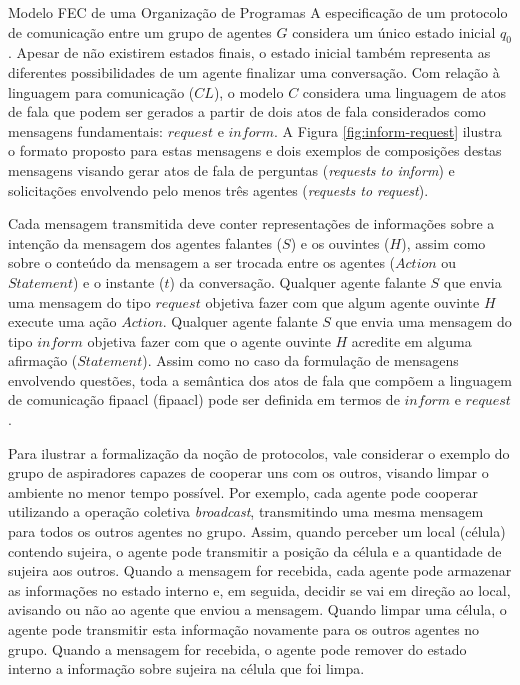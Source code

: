 \begin{section}{Modelo FEC de uma Organização de Programas}
        A especificação de um protocolo de comunicação entre um grupo de agentes $G$ considera um único estado inicial $q_0$. Apesar de não existirem estados finais, o estado inicial também representa as diferentes possibilidades de um agente finalizar uma conversação. Com relação à linguagem para comunicação ($CL$), o modelo $C$ considera uma linguagem de atos de fala que podem ser gerados a partir de dois atos de fala considerados como mensagens fundamentais: $request$ e $inform$. A Figura \ref{fig:inform-request} ilustra o formato proposto para estas mensagens e dois exemplos de composições destas mensagens visando gerar atos de fala de perguntas (\textit{requests to inform}) e solicitações envolvendo pelo menos três agentes (\textit{requests to request}). 
    
        \begin{figure}[h!]
            \centering
        \end{figure}
            
        Cada mensagem transmitida deve conter representações de informações sobre a intenção da mensagem dos agentes falantes ($S$) e os ouvintes ($H$), assim como sobre o conteúdo da mensagem a ser trocada entre os agentes ($Action$ ou $Statement$) e o instante ($t$) da conversação. Qualquer agente falante $S$ que envia uma mensagem do tipo $request$ objetiva fazer com que algum agente ouvinte $H$ execute uma ação $Action$. Qualquer agente falante $S$ que envia uma mensagem do tipo $inform$ objetiva fazer com que o agente ouvinte $H$ acredite em alguma afirmação ($Statement$). Assim como no caso da formulação de mensagens envolvendo questões, toda a semântica dos atos de fala que compõem a linguagem de comunicação \acrshort{fipaacl} (\acrlong{fipaacl}) pode ser definida em termos de $inform$ e $request$.
        
        Para ilustrar a formalização da noção de protocolos, vale considerar o exemplo do grupo de aspiradores capazes de cooperar uns com os outros, visando limpar o ambiente no menor tempo possível. Por exemplo, cada agente pode cooperar utilizando a operação coletiva \textit{broadcast}, transmitindo uma mesma mensagem para todos os outros agentes no grupo. Assim, quando perceber um local (célula) contendo sujeira, o agente pode transmitir a posição da célula e a quantidade de sujeira aos outros. Quando a mensagem for recebida, cada agente pode armazenar as informações no estado interno e, em seguida, decidir se vai em direção ao local, avisando ou não ao agente que enviou a mensagem. Quando limpar uma célula, o agente pode transmitir esta informação novamente para os outros agentes no grupo. Quando a mensagem for recebida, o agente pode remover do estado interno a informação sobre sujeira na célula que foi limpa.
        

\end{section}
